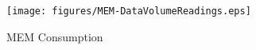 \begin{figure}[t]
    \centering
    \texttt{[image: figures/MEM-DataVolumeReadings.eps]}
    \caption{MEM Consumption}
    \label{fig:MEM Consumption}
\end{figure}

%
%
%
%
%
%
%
%
%
